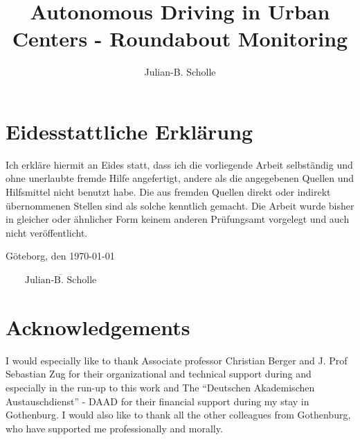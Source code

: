 \documentclass[11pt,oneside,openright]{mpreport}
\title{Autonomous Driving in Urban Centers - Roundabout Monitoring}
\author{Julian-B. Scholle}
\begin{document}
\maketitle



\chapter*{Eidesstattliche Erklärung}
Ich erkläre hiermit an Eides statt, dass ich die vorliegende Arbeit selbständig und
ohne unerlaubte fremde Hilfe angefertigt, andere als die angegebenen Quellen und
Hilfsmittel nicht benutzt habe. Die aus fremden Quellen direkt oder indirekt
übernommenen Stellen sind als solche kenntlich gemacht.
Die Arbeit wurde bisher in gleicher oder ähnlicher Form keinem anderen
Prüfungsamt vorgelegt und auch nicht veröffentlicht.

\noindent Göteborg, den \today
\begin{flushright}
$\overline{~~~~~~~~~\mbox{Julian-B. Scholle}~~~~~~~~~}$
\end{flushright}


\chapter*{Acknowledgements}

I would especially like to thank Associate professor Christian Berger and J. Prof Sebastian Zug for their organizational and technical support during and especially in the run-up to this work and
The ``Deutschen Akademischen Austauschdienst'' - DAAD for their financial support during my stay in Gothenburg.
I would also like to thank all the other colleagues from Gothenburg, who have supported me professionally and morally.



\tableofcontents
\clearpage 




\end{document}
